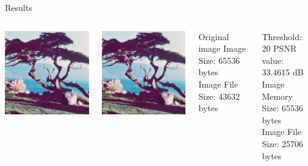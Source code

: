 \documentclass{beamer}
\begin{document}
\begin{frame}{Results}

\begin{columns}[T,onlytextwidth]

	
	\centering
	\includegraphics[page=1, width=.7\columnwidth]{image/images}

	\includegraphics[page=2, width=.7\columnwidth]{image/images}


	\begin{MyBox}{Original image}
		\footnotesize{
		Image Size: 65536 bytes \\
		Image File Size: 43632 bytes
		}
	\end{MyBox}

	\medskip \medskip \medskip \medskip \medskip \medskip \medskip 

	\begin{MyBox}{Threshold: 20}
		\footnotesize{
		PSNR value: 33.4615 dB \\
		Image Memory Size: 65536 bytes \\
		Image File Size: 25706 bytes
		}
	\end{MyBox}

\end{columns}
		
\end{frame}
\end{document}
